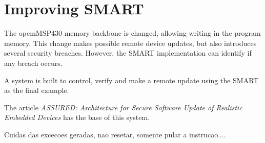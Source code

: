 \chapter{Improving SMART}

The opemMSP430 memory backbone is changed, allowing writing in the program memory.  This change makes possible remote device updates, but also introduces several security breaches.  However, the SMART implementation can identify if any breach occurs.

A system is built to control, verify and make a remote update using the SMART as the final example.

The article \textit{ASSURED: Architecture for Secure Software Update of Realistic Embedded Devices}\cite{assured} has the base of this system.


Cuidas das excecoes geradas, nao resetar, somente pular a instrucao....


